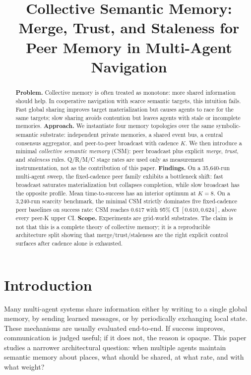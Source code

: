 \documentclass{article}
\title{Collective Semantic Memory: Merge, Trust, and Staleness for Peer Memory in Multi-Agent Navigation}
\begin{document}
\maketitle

\begin{abstract}
\textbf{Problem.} Collective memory is often treated as monotone: more shared information should help. In cooperative navigation with scarce semantic targets, this intuition fails. Fast global sharing improves target materialization but causes agents to race for the same targets; slow sharing avoids contention but leaves agents with stale or incomplete memories.
\textbf{Approach.} We instantiate four memory topologies over the same symbolic-semantic substrate: independent private memories, a shared event bus, a central consensus aggregator, and peer-to-peer broadcast with cadence $K$. We then introduce a minimal \emph{collective semantic memory} (CSM): peer broadcast plus explicit \emph{merge}, \emph{trust}, and \emph{staleness} rules. Q/R/M/C stage rates are used only as measurement instrumentation, not as the contribution of this paper.
\textbf{Findings.} On a 35{,}640-run multi-agent sweep, the fixed-cadence peer family exhibits a bottleneck shift: fast broadcast saturates materialization but collapses completion, while slow broadcast has the opposite profile. Mean time-to-success has an interior optimum at $K{=}8$. On a 3{,}240-run scarcity benchmark, the minimal CSM strictly dominates five fixed-cadence peer baselines on success rate: CSM reaches $0.617$ with 95\% CI $[0.610,0.624]$, above every peer-K upper CI.
\textbf{Scope.} Experiments are grid-world substrates. The claim is not that this is a complete theory of collective memory; it is a reproducible architecture split showing that merge/trust/staleness are the right explicit control surfaces after cadence alone is exhausted.
\end{abstract}

\section{Introduction}

Many multi-agent systems share information either by writing to a
single global memory, by sending learned messages, or by periodically
exchanging local state. These mechanisms are usually evaluated
end-to-end. If success improves, communication is judged useful; if it
does not, the reason is opaque. This paper studies a narrower
architectural question: when multiple agents maintain semantic memory
about places, what should be shared, at what rate, and with what
weight?
\end{document}

